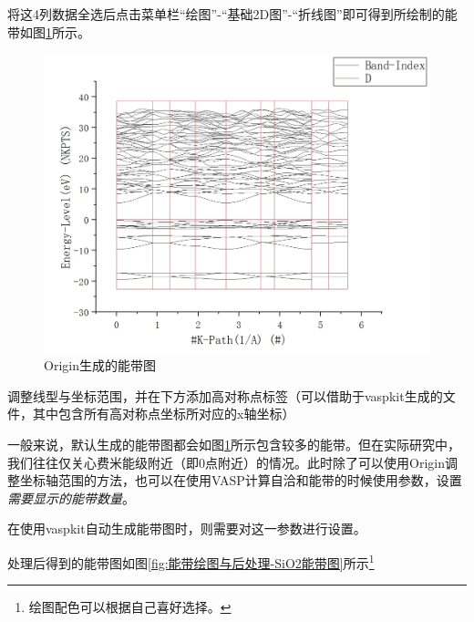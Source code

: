 将这4列数据全选后点击菜单栏“绘图”-“基础2D图”-“折线图”即可得到所绘制的能带如图\ref{fig:能带绘图与后处理-Origin生成的能带图}所示。

\begin{figure}
    \centering
    \includegraphics[width=1\linewidth]{VASP计算/能带计算/能带绘图与后处理/fig/Origin生成能带.png}
    \caption{Origin生成的能带图}
    \label{fig:能带绘图与后处理-Origin生成的能带图}
\end{figure}

调整线型与坐标范围，并在下方添加高对称点标签（可以借助于vaspkit生成的文件，其中包含所有高对称点坐标所对应的x轴坐标）

\begin{attention}
    一般来说，默认生成的能带图都会如图\ref{fig:能带绘图与后处理-Origin生成的能带图}所示包含较多的能带。但在实际研究中，我们往往仅关心费米能级附近（即0点附近）的情况。此时除了可以使用Origin调整坐标轴范围的方法，也可以在使用VASP计算自洽和能带的时候使用参数，设置\emph{需要显示的能带数量}。

    在使用vaspkit自动生成能带图时，则需要对这一参数进行设置。
\end{attention}

处理后得到的能带图如图\ref{fig:能带绘图与后处理-SiO2能带图}所示\footnote{绘图配色可以根据自己喜好选择。}

